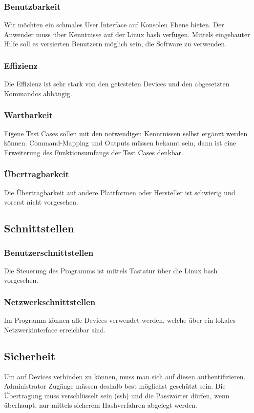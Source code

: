 \subsubsection{Benutzbarkeit}
Wir möchten ein schmales User Interface auf Konsolen Ebene bieten. Der Anwender muss über Kenntnisse auf der Linux bash verfügen. Mittels eingebauter Hilfe soll es versierten Benutzern möglich sein, die Software zu verwenden.
\subsubsection{Effizienz}
Die Effizienz ist sehr stark von den getesteten Devices und den abgesetzten Kommandos abhängig. 
\subsubsection{Wartbarkeit}
Eigene Test Cases sollen mit den notwendigen Kenntnissen selbst ergänzt werden können. Command-Mapping und Outputs müssen bekannt sein, dann ist eine Erweiterung des Funktionsumfangs der Test Cases denkbar.
\subsubsection{Übertragbarkeit}
Die Übertragbarkeit auf andere Plattformen oder Hersteller ist schwierig und vorerst nicht vorgesehen.

\subsection{Schnittstellen}
\subsubsection{Benutzerschnittstellen}
Die Steuerung des Programms ist mittels Tastatur über die Linux bash vorgesehen.

\subsubsection{Netzwerkschnittstellen}
Im Programm können alle Devices verwendet werden, welche über ein lokales Netzwerkinterface erreichbar sind.

\subsection{Sicherheit}
Um auf Devices verbinden zu können, muss man sich auf diesen authentifizieren. Administrator Zugänge müssen deshalb best möglichst geschützt sein. Die Übertragung muss verschlüsselt sein (ssh) und die Passwörter dürfen, wenn überhaupt, nur mittels sicherem Hashverfahren abgelegt werden.